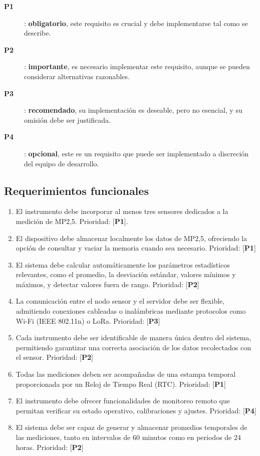 \begin{description}
	\item [\textbf{P1}]: \textbf{obligatorio}, este requisito es crucial y debe implementarse tal como se describe.
	\item [\textbf{P2}]: \textbf{importante}, es necesario implementar este requisito, aunque se pueden considerar alternativas razonables.
	\item [\textbf{P3}]: \textbf{recomendado}, su implementación es deseable, pero no esencial, y su omisión debe ser justificada.
	\item [\textbf{P4}]: \textbf{opcional}, este es un requisito que puede ser implementado a discreción del equipo de desarrollo.
\end{description}

\subsection{Requerimientos funcionales}
\begin{enumerate}[label=\alph*)]
	\item El instrumento debe incorporar al menos tres sensores dedicados a la medición de MP2,5. Prioridad: [\textbf{P1}].
	\item El dispositivo debe almacenar localmente los datos de MP2,5, ofreciendo la opción de consultar y vaciar la memoria cuando sea necesario. Prioridad: [\textbf{P1}]
	\item El sistema debe calcular automáticamente los parámetros estadísticos relevantes, como el promedio, la desviación estándar, valores mínimos y máximos, y detectar valores fuera de rango. Prioridad: [\textbf{P2}]
	\item La comunicación entre el nodo sensor y el servidor debe ser flexible, admitiendo conexiones cableadas o inalámbricas mediante protocolos como Wi-Fi (IEEE 802.11n) o LoRa. Prioridad: [\textbf{P3}]
	\item Cada instrumento debe ser identificable de manera única dentro del sistema, permitiendo garantizar una correcta asociación de los datos recolectados con el sensor. Prioridad: [\textbf{P2}]
	\item Todas las mediciones deben ser acompañadas de una estampa temporal proporcionada por un Reloj de Tiempo Real (RTC). Prioridad: [\textbf{P1}]
	\item El instrumento debe ofrecer funcionalidades de monitoreo remoto que permitan verificar su estado operativo, calibraciones y ajustes. Prioridad: [\textbf{P4}]
	\item El sistema debe ser capaz de generar y almacenar promedios temporales de las mediciones, tanto en intervalos de 60 minutos como en periodos de 24 horas. Prioridad: [\textbf{P2}]
\end{enumerate}

